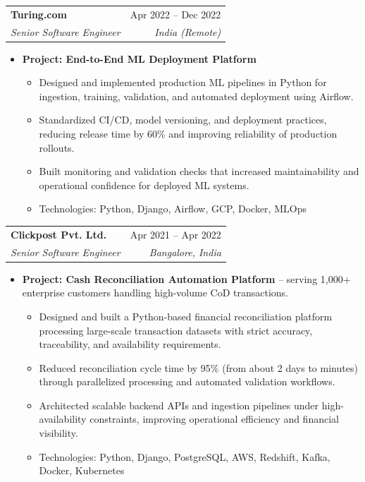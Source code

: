 \documentclass[letterpaper,10pt]{article}
\makeatletter
\newcommand{\resumeItem}[1]{\item\small{#1}}
\newcommand{\resumeSubheading}[4]{
\vspace{-1pt}\item
  \begin{tabular*}{0.97\textwidth}[t]{l@{\extracolsep{\fill}}r}
    \textbf{#1} & #2 \\
    \textit{#3} & \textit{#4} \\
  \end{tabular*}\vspace{-7pt}
}
\newcommand{\resumeSubHeadingList}{\begin{itemize}[leftmargin=0.15in, label={}]}
\newcommand{\resumeSubHeadingListEnd}{\end{itemize}}
\makeatother
\begin{document}
  \resumeSubheading
      {Turing.com}{Apr 2022 -- Dec 2022}
      {Senior Software Engineer}{India (Remote)}
      \resumeSubHeadingList
          \resumeItem{\textbf{Project: End-to-End ML Deployment Platform}}
          \begin{itemize}[leftmargin=1.4em,label=•]
              \item \small{Designed and implemented production ML pipelines in Python for ingestion, training, validation, and automated deployment using Airflow.}
              \item \small{Standardized CI/CD, model versioning, and deployment practices, reducing release time by 60\% and improving reliability of production rollouts.}
              \item \small{Built monitoring and validation checks that increased maintainability and operational confidence for deployed ML systems.}
              \item \small{Technologies: Python, Django, Airflow, GCP, Docker, MLOps}
          \end{itemize}
      \resumeSubHeadingListEnd

  \resumeSubheading
      {Clickpost Pvt. Ltd.}{Apr 2021 -- Apr 2022}
      {Senior Software Engineer}{Bangalore, India}
      \resumeSubHeadingList
          \resumeItem{\textbf{Project: Cash Reconciliation Automation Platform} -- serving 1,000+ enterprise customers handling high-volume CoD transactions.}
          \begin{itemize}[leftmargin=1.4em,label=•]
              \item \small{Designed and built a Python-based financial reconciliation platform processing large-scale transaction datasets with strict accuracy, traceability, and availability requirements.}
              \item \small{Reduced reconciliation cycle time by 95\% (from about 2 days to minutes) through parallelized processing and automated validation workflows.}
              \item \small{Architected scalable backend APIs and ingestion pipelines under high-availability constraints, improving operational efficiency and financial visibility.}
              \item \small{Technologies: Python, Django, PostgreSQL, AWS, Redshift, Kafka, Docker, Kubernetes}
          \end{itemize}
      \resumeSubHeadingListEnd
\end{document}
